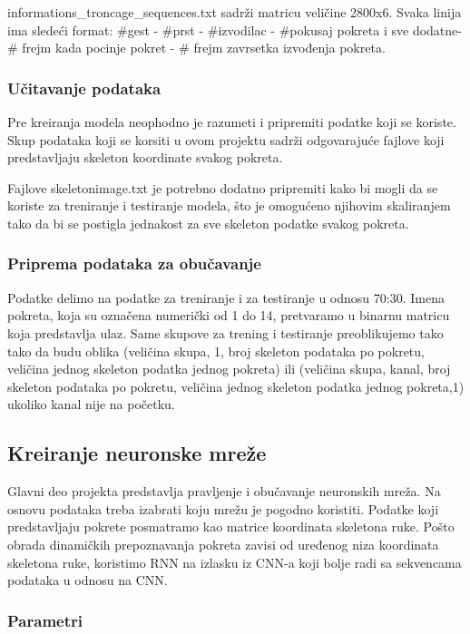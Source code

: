 \documentclass{article}
\begin{document}
informations\_troncage\_sequences.txt sadrži matricu veličine 2800x6. Svaka linija ima sledeći format: \#gest - \#prst - \#izvodilac - \#pokusaj pokreta i sve dodatne- \# frejm kada pocinje pokret - \# frejm zavrsetka izvođenja pokreta.

\subsubsection{Učitavanje podataka}
Pre kreiranja modela neophodno je razumeti i pripremiti podatke koji se
koriste. Skup podataka koji se korsiti u ovom projektu sadrži odgovarajuće
fajlove koji predstavljaju skeleton koordinate svakog pokreta.

Fajlove skeletonimage.txt je potrebno dodatno pripremiti kako bi mogli da se
koriste za treniranje i testiranje modela, što je omogućeno njihovim skaliranjem tako da bi se postigla jednakost za sve skeleton podatke svakog pokreta.

\subsubsection{Priprema podataka za obučavanje}
Podatke delimo na podatke za treniranje i za testiranje u odnosu 70:30.
Imena pokreta, koja su označena numerički od 1 do 14, pretvaramo u binarnu matricu koja predstavlja ulaz.
Same skupove za trening i testiranje preoblikujemo tako tako da budu oblika (veličina skupa, 1, broj skeleton podataka po pokretu, veličina jednog skeleton podatka jednog pokreta) 
ili (veličina skupa, kanal, broj skeleton podataka po pokretu, veličina jednog skeleton podatka jednog pokreta,1) ukoliko kanal nije na početku.

\newpage

\subsection{Kreiranje neuronske mreže}

Glavni deo projekta predstavlja pravljenje i obučavanje neuronskih mreža.
Na osnovu podataka treba izabrati koju mrežu je pogodno koristiti. Podatke
koji predstavljaju pokrete posmatramo kao matrice koordinata skeletona ruke.
Pošto obrada dinamičkih prepoznavanja pokreta zavisi od uređenog niza
koordinata skeletona ruke, koristimo RNN na izlasku iz CNN-a koji bolje radi sa sekvencama podataka u odnosu na CNN.
\subsubsection{Parametri}
\end{document}
